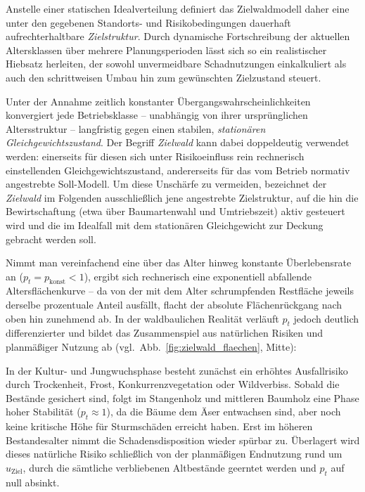 \documentclass[twocolumn, paper=a4, fontsize=10pt]{scrartcl}
\begin{document}
Anstelle einer statischen Idealverteilung definiert das Zielwaldmodell daher eine unter den gegebenen Standorts- und Risikobedingungen dauerhaft aufrechterhaltbare \emph{Zielstruktur}. Durch dynamische Fortschreibung der aktuellen Altersklassen über mehrere Planungsperioden lässt sich so ein realistischer Hiebsatz herleiten, der sowohl unvermeidbare Schadnutzungen einkalkuliert als auch den schrittweisen Umbau hin zum gewünschten Zielzustand steuert.

Unter der Annahme zeitlich konstanter Übergangswahrscheinlichkeiten konvergiert jede Betriebsklasse -- unabhängig von ihrer ursprünglichen Altersstruktur -- langfristig gegen einen stabilen, \emph{stationären Gleichgewichtszustand}. Der Begriff \emph{Zielwald} kann dabei doppeldeutig verwendet werden: einerseits für diesen sich unter Risikoeinfluss rein rechnerisch einstellenden Gleichgewichtszustand, andererseits für das vom Betrieb normativ angestrebte Soll-Modell. Um diese Unschärfe zu vermeiden, bezeichnet der \emph{Zielwald} im Folgenden ausschließlich jene angestrebte Zielstruktur, auf die hin die Bewirtschaftung (etwa über Baumartenwahl und Umtriebszeit) aktiv gesteuert wird und die im Idealfall mit dem stationären Gleichgewicht zur Deckung gebracht werden soll.

Nimmt man vereinfachend eine über das Alter hinweg konstante Überlebensrate an ($p_t = p_{\text{konst}} < 1$), ergibt sich rechnerisch eine exponentiell abfallende Altersflächenkurve -- da von der mit dem Alter schrumpfenden Restfläche jeweils derselbe prozentuale Anteil ausfällt, flacht der absolute Flächenrückgang nach oben hin zunehmend ab. In der waldbaulichen Realität verläuft $p_t$ jedoch deutlich differenzierter und bildet das Zusammenspiel aus natürlichen Risiken und planmäßiger Nutzung ab (vgl.\ Abb.~\ref{fig:zielwald_flaechen}, Mitte): 

In der Kultur- und Jungwuchsphase besteht zunächst ein erhöhtes Ausfallrisiko durch Trockenheit, Frost, Konkurrenzvegetation oder Wildverbiss. Sobald die Bestände gesichert sind, folgt im Stangenholz und mittleren Baumholz eine Phase hoher Stabilität ($p_t \approx 1$), da die Bäume dem Äser entwachsen sind, aber noch keine kritische Höhe für Sturmschäden erreicht haben. Erst im höheren Bestandesalter nimmt die Schadensdisposition wieder spürbar zu. Überlagert wird dieses natürliche Risiko schließlich von der planmäßigen Endnutzung rund um $u_{\text{Ziel}}$, durch die sämtliche verbliebenen Altbestände geerntet werden und $p_t$ auf null absinkt.
\end{document}
